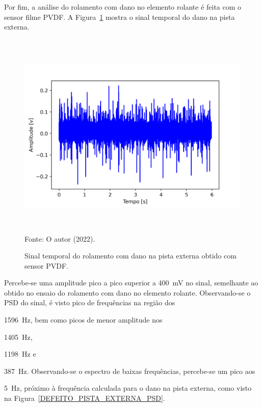 \documentclass[
	12pt,				
	oneside,			
	a4paper,			
	english,			
	brazil,	
	sumario=abnt-6027-2012		
	]{abntex2ppgsi}
\begin{document}
{{{{{{{{{{{{{{{{{{{{{%

\section{}

Por fim, a análise do rolamento com dano no elemento rolante é feita com o sensor filme PVDF. A Figura~\ref{DEFEITO_PISTA_EXTERNA} mostra o sinal temporal do dano na pista externa.

\begin{figure}[H]
\centering
\caption {Sinal temporal do rolamento com dano na pista externa obtido com sensor PVDF.}
\includegraphics[width=\textwidth,height=100mm,keepaspectratio]{aquisicao_07_dano_externa_11_03_2022_15h15min_ajustado_6s} \\
Fonte: O autor (2022).
\label{DEFEITO_PISTA_EXTERNA}
\end{figure} 

Percebe-se uma amplitude pico a pico superior a {\SI{400}{\milli\volt}} no sinal, semelhante ao obtido no ensaio do rolamento com dano no elemento rolante. Observando-se o PSD do sinal, é visto pico de frequências na região dos {\SI{1596}{\hertz}, bem como picos de menor amplitude nos {\SI{1405}{\hertz}, {\SI{1198}{\hertz} e {\SI{387}{\hertz}. Observando-se o espectro de baixas frequências, percebe-se um pico aos {\SI{5}{\hertz}, próximo à frequência calculada para o dano na pista externa, como visto na Figura~\ref{DEFEITO_PISTA_EXTERNA_PSD}.

}}}}}}}}}}}}}}}}}}}}}}}}}}
\end{document}

